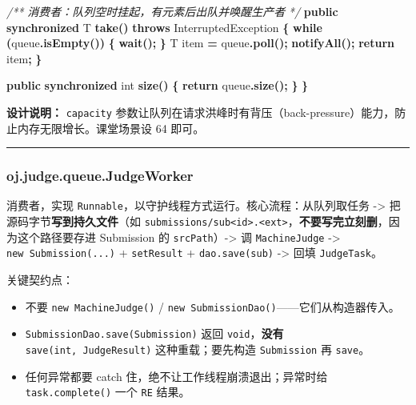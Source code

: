 \documentclass[
  11pt,
]{ctexart}
\newenvironment{Shaded}{\begin{snugshade}}{\end{snugshade}}
\newcommand{\BuiltInTok}[1]{#1}
\newcommand{\CommentTok}[1]{\textcolor[rgb]{0.56,0.35,0.01}{\textit{#1}}}
\newcommand{\ControlFlowTok}[1]{\textcolor[rgb]{0.13,0.29,0.53}{\textbf{#1}}}
\newcommand{\DataTypeTok}[1]{\textcolor[rgb]{0.13,0.29,0.53}{#1}}
\newcommand{\FunctionTok}[1]{\textcolor[rgb]{0.13,0.29,0.53}{\textbf{#1}}}
\newcommand{\KeywordTok}[1]{\textcolor[rgb]{0.13,0.29,0.53}{\textbf{#1}}}
\newcommand{\NormalTok}[1]{#1}
\newcommand{\OperatorTok}[1]{\textcolor[rgb]{0.81,0.36,0.00}{\textbf{#1}}}
\providecommand{\tightlist}{%
  \setlength{\itemsep}{0pt}\setlength{\parskip}{0pt}}
\begin{document}
\begin{Shaded}
\begin{Highlighting}[]
    \CommentTok{/**} \CommentTok{消费者：队列空时挂起，有元素后出队并唤醒生产者} \CommentTok{*/}
    \KeywordTok{public} \KeywordTok{synchronized}\NormalTok{ T }\FunctionTok{take}\OperatorTok{()} \KeywordTok{throws} \BuiltInTok{InterruptedException} \OperatorTok{\{}
        \ControlFlowTok{while} \OperatorTok{(}\NormalTok{queue}\OperatorTok{.}\FunctionTok{isEmpty}\OperatorTok{())} \OperatorTok{\{}
            \FunctionTok{wait}\OperatorTok{();}
        \OperatorTok{\}}
\NormalTok{        T item }\OperatorTok{=}\NormalTok{ queue}\OperatorTok{.}\FunctionTok{poll}\OperatorTok{();}
        \FunctionTok{notifyAll}\OperatorTok{();}
        \ControlFlowTok{return}\NormalTok{ item}\OperatorTok{;}
    \OperatorTok{\}}

    \KeywordTok{public} \KeywordTok{synchronized} \DataTypeTok{int} \FunctionTok{size}\OperatorTok{()} \OperatorTok{\{}
        \ControlFlowTok{return}\NormalTok{ queue}\OperatorTok{.}\FunctionTok{size}\OperatorTok{();}
    \OperatorTok{\}}
\OperatorTok{\}}
\end{Highlighting}
\end{Shaded}

\textbf{设计说明：} \texttt{capacity}
参数让队列在请求洪峰时有背压（back-pressure）能力，防止内存无限增长。课堂场景设
64 即可。

\begin{center}\rule{0.5\linewidth}{0.5pt}\end{center}

\hypertarget{oj.judge.queue.judgeworker}{%
\subsubsection{oj.judge.queue.JudgeWorker}\label{oj.judge.queue.judgeworker}}

消费者，实现
\texttt{Runnable}，以守护线程方式运行。核心流程：从队列取任务
-\textgreater{} 把源码字节\textbf{写到持久文件}（如
\texttt{submissions/sub\textless{}id\textgreater{}.\textless{}ext\textgreater{}}，\textbf{不要写完立刻删}，因为这个路径要存进
Submission 的 \texttt{srcPath}）-\textgreater{} 调 \texttt{MachineJudge}
-\textgreater{} \texttt{new\ Submission(...)} + \texttt{setResult} +
\texttt{dao.save(sub)} -\textgreater{} 回填 \texttt{JudgeTask}。

关键契约点：

\begin{itemize}
\tightlist
\item
  不要 \texttt{new\ MachineJudge()} /
  \texttt{new\ SubmissionDao()}------它们从构造器传入。
\item
  \texttt{SubmissionDao.save(Submission)} 返回
  \texttt{void}，\textbf{没有} \texttt{save(int,\ JudgeResult)}
  这种重载；要先构造 \texttt{Submission} 再 \texttt{save}。
\item
  任何异常都要 catch 住，绝不让工作线程崩溃退出；异常时给
  \texttt{task.complete()} 一个 \texttt{RE} 结果。
\end{itemize}
\end{document}
